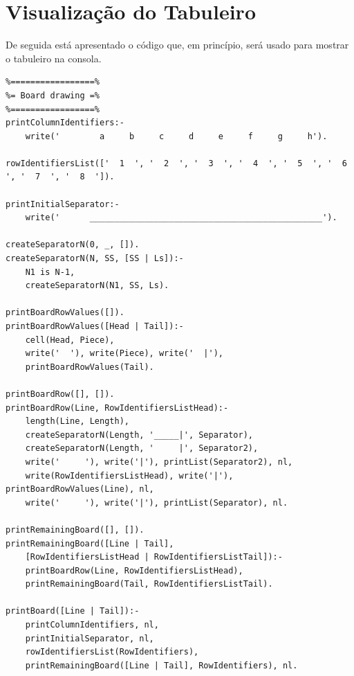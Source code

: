 \documentclass[a4paper]{article}
\begin{document}
\pagebreak
\section{Visualização do Tabuleiro}


\begin{small}
De seguida está apresentado o código que, em princípio, será usado para mostrar o tabuleiro na consola.
\end{small}

\begin{small}
\begin{lstlisting}
%=================%
%= Board drawing =%
%=================%
printColumnIdentifiers:-
	write('        a     b     c     d     e     f     g     h').

rowIdentifiersList(['  1  ', '  2  ', '  3  ', '  4  ', '  5  ', '  6  ', '  7  ', '  8  ']).

printInitialSeparator:-
	write('      _______________________________________________').

createSeparatorN(0, _, []).
createSeparatorN(N, SS, [SS | Ls]):-
	N1 is N-1,
	createSeparatorN(N1, SS, Ls).

printBoardRowValues([]).
printBoardRowValues([Head | Tail]):-
	cell(Head, Piece),
	write('  '), write(Piece), write('  |'),
	printBoardRowValues(Tail).

printBoardRow([], []).
printBoardRow(Line, RowIdentifiersListHead):-
	length(Line, Length),
	createSeparatorN(Length, '_____|', Separator),
	createSeparatorN(Length, '     |', Separator2),
	write('     '), write('|'), printList(Separator2), nl,
	write(RowIdentifiersListHead), write('|'), printBoardRowValues(Line), nl,
	write('     '), write('|'), printList(Separator), nl.

printRemainingBoard([], []).
printRemainingBoard([Line | Tail],
	[RowIdentifiersListHead | RowIdentifiersListTail]):-
	printBoardRow(Line, RowIdentifiersListHead),
	printRemainingBoard(Tail, RowIdentifiersListTail).

printBoard([Line | Tail]):-
	printColumnIdentifiers, nl,
	printInitialSeparator, nl,
	rowIdentifiersList(RowIdentifiers),
	printRemainingBoard([Line | Tail], RowIdentifiers), nl.
\end{lstlisting}
\end{small}
\end{document}
